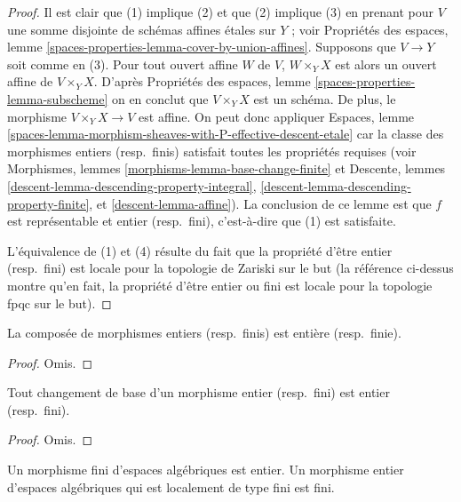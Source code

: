 \begin{proof}
Il est clair que (1) implique (2) et que (2) implique (3) en prenant pour
$V$ une somme disjointe de schémas affines étales sur $Y$ ; voir
Propriétés des espaces,
lemme \ref{spaces-properties-lemma-cover-by-union-affines}.
Supposons que $V \to Y$ soit comme en (3). Pour tout ouvert affine $W$ de $V$,
$W \times_Y X$ est alors un ouvert affine de $V \times_Y X$. D'après
Propriétés des espaces, lemme \ref{spaces-properties-lemma-subscheme}
on en conclut que $V \times_Y X$ est un schéma. De plus, le morphisme
$V \times_Y X \to V$ est affine. On peut donc appliquer
Espaces,
lemme \ref{spaces-lemma-morphism-sheaves-with-P-effective-descent-etale}
car la classe des morphismes entiers (resp.\ finis)
satisfait toutes les propriétés requises (voir
Morphismes, lemmes \ref{morphisms-lemma-base-change-finite} et
Descente, lemmes
\ref{descent-lemma-descending-property-integral},
\ref{descent-lemma-descending-property-finite},
et \ref{descent-lemma-affine}).
La conclusion de ce lemme est que $f$ est représentable
et entier (resp.\ fini), c'est-à-dire que (1) est satisfaite.

\medskip\noindent
L'équivalence de (1) et (4) résulte du fait que la propriété d'être
entier (resp.\ fini) est locale pour la topologie de Zariski sur le but (la
référence ci-dessus montre qu'en fait, la propriété d'être entier ou fini est
locale pour la topologie fpqc sur le but).
\end{proof}

\begin{lemma}
\label{lemma-composition-integral}
La composée de morphismes entiers (resp.\ finis) est entière
(resp.\ finie).
\end{lemma}

\begin{proof}
Omis.
\end{proof}

\begin{lemma}
\label{lemma-base-change-integral}
Tout changement de base d'un morphisme entier (resp.\ fini) est entier
(resp.\ fini).
\end{lemma}

\begin{proof}
Omis.
\end{proof}

\begin{lemma}
\label{lemma-finite-integral}
Un morphisme fini d'espaces algébriques est entier.
Un morphisme entier d'espaces algébriques
qui est localement de type fini est fini.
\end{lemma}

